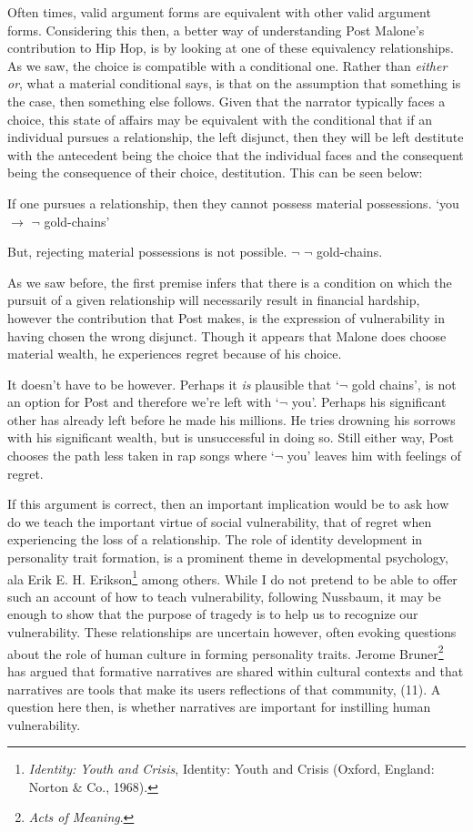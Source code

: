 \documentclass[phdthesis,12pt,final]{wuthesis}
\theoremstyle{definition}
\theoremstyle{definition}
\theoremstyle{definition}
\theoremstyle{definition}
\theoremstyle{remark}
\begin{document}
Often times, valid argument forms are equivalent with other valid argument forms. Considering this then, a better way of understanding Post Malone's contribution to Hip Hop, is by looking at one of these equivalency relationships. As we saw, the choice is compatible with a conditional one. Rather than \emph{either or}, what a material conditional says, is that on the assumption that something is the case, then something else follows. Given that the narrator typically faces a choice, this state of affairs may be equivalent with the conditional that if an individual pursues a relationship, the left disjunct, then they will be left destitute with the antecedent being the choice that the individual faces and the consequent being the consequence of their choice, destitution. This can be seen below:

If one pursues a relationship, then they cannot possess material possessions. `you \(\rightarrow\) \(\lnot\) gold-chains'

But, rejecting material possessions is not possible. \(\lnot\) \(\lnot\) gold-chains.

As we saw before, the first premise infers that there is a condition on which the pursuit of a given relationship will necessarily result in financial hardship, however the contribution that Post makes, is the expression of vulnerability in having chosen the wrong disjunct. Though it appears that Malone does choose material wealth, he experiences regret because of his choice.

It doesn't have to be however. Perhaps it \emph{is} plausible that `\(\lnot\) gold chains', is not an option for Post and therefore we're left with `\(\lnot\) you'. Perhaps his significant other has already left before he made his millions. He tries drowning his sorrows with his significant wealth, but is unsuccessful in doing so. Still either way, Post chooses the path less taken in rap songs where `\(\lnot\) you' leaves him with feelings of regret.

If this argument is correct, then an important implication would be to ask how do we teach the important virtue of social vulnerability, that of regret when experiencing the loss of a relationship. The role of identity development in personality trait formation, is a prominent theme in developmental psychology, ala Erik E. H. Erikson\footnote{\emph{Identity: Youth and Crisis}, Identity: Youth and Crisis (Oxford, England: Norton \& Co., 1968).} among others. While I do not pretend to be able to offer such an account of how to teach vulnerability, following Nussbaum, it may be enough to show that the purpose of tragedy is to help us to recognize our vulnerability. These relationships are uncertain however, often evoking questions about the role of human culture in forming personality traits. Jerome Bruner\footnote{\emph{Acts of Meaning}.} has argued that formative narratives are shared within cultural contexts and that narratives are tools that make its users reflections of that community, (11). A question here then, is whether narratives are important for instilling human vulnerability.
\end{document}
